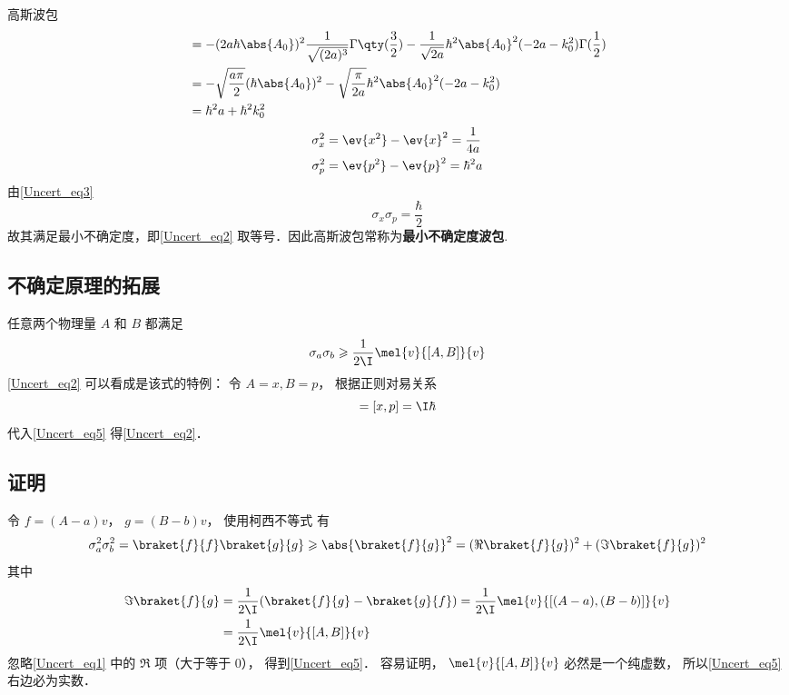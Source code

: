 \begin{example}{高斯波包}
\begin{equation}
\begin{aligned}
&=-(2a\hbar\abs{A_0})^2\frac{1}{\sqrt{(2a)^3}}\Gamma\qty(\frac{3}{2})-\frac{1}{\sqrt{2a}}\hbar^2 \abs{A_0}^2(-2a-k_0^2)\Gamma(\frac{1}{2})\\
&=-\sqrt{\frac{a\pi}{2}}(\hbar\abs{A_0})^2-\sqrt{\frac{\pi}{2a}}\hbar^2 \abs{A_0}^2(-2a-k_0^2)\\
&=\hbar^2a+\hbar^2k_0^2
\end{aligned}
\end{equation}
\begin{equation}\label{Uncert_eq3}
\begin{aligned}
\sigma_x^2&=\ev{x^2}-\ev{x}^2=\frac{1}{4a} \\
\sigma_p^2&=\ev{p^2}-\ev{p}^2=\hbar^2a
\end{aligned}
\end{equation}
由\autoref{Uncert_eq3} 
\begin{equation}
\sigma_x\sigma_p=\frac{\hbar}{2}
\end{equation}
故其满足最小不确定度，即\autoref{Uncert_eq2} 取等号．因此高斯波包常称为\textbf{最小不确定度波包}.
\end{example}

\subsection{不确定原理的拓展}
任意两个物理量 $A$ 和 $B$ 都满足
\begin{equation}\label{Uncert_eq5}
\sigma_a \sigma_b \geqslant \frac{1}{2\I}\mel{v}{[A, B]}{v}
\end{equation}
\autoref{Uncert_eq2} 可以看成是该式的特例： 令 $A = x, B = p$， 根据正则对易关系
\begin{equation}
[A, B] = [x, p] = \I\hbar
\end{equation}
代入\autoref{Uncert_eq5} 得\autoref{Uncert_eq2}． 

\subsection{证明}
令 $f = (A-a)v$， $g = (B-b)v$， 使用柯西不等式 有
\begin{equation}\label{Uncert_eq1}
\sigma_a^2 \sigma_b^2 = \braket{f}{f} \braket{g}{g} \geqslant \abs{\braket{f}{g}}^2 = (\Re\braket{f}{g})^2 + (\Im\braket{f}{g})^2
\end{equation}
其中
\begin{equation}
\begin{aligned}
\Im\braket{f}{g} &= \frac{1}{2\I}(\braket{f}{g} - \braket{g}{f})
= \frac{1}{2\I}\mel{v}{[(A-a), (B-b)]}{v}\\
&= \frac{1}{2\I}\mel{v}{[A, B]}{v}
\end{aligned}
\end{equation}
忽略\autoref{Uncert_eq1} 中的 $\Re$ 项（大于等于 0）， 得到\autoref{Uncert_eq5}． 容易证明， $\mel{v}{[A, B]}{v}$ 必然是一个纯虚数， 所以\autoref{Uncert_eq5} 右边必为实数．
